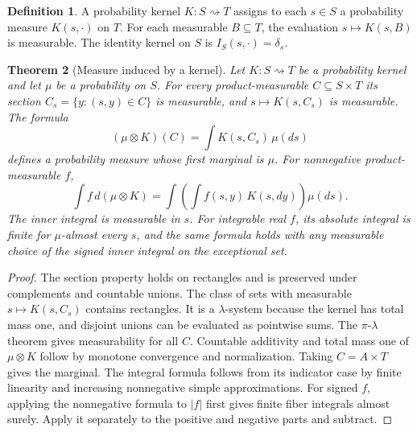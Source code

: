 \documentclass[11pt,oneside,openany]{book}
\theoremstyle{plain}
\newtheorem{theorem}{Theorem}[chapter]
\theoremstyle{definition}
\newtheorem{definition}[theorem]{Definition}
\theoremstyle{remark}
\begin{document}
\begin{definition}
A probability kernel \(K:S\rightsquigarrow T\) assigns to each \(s\in S\) a probability measure \(K(s,\cdot)\) on \(T\). For each measurable \(B\subseteq T\), the evaluation \(s\mapsto K(s,B)\) is measurable. The identity kernel on \(S\) is \(I_S(s,\cdot)=\delta_s\).
\end{definition}

\begin{theorem}[Measure induced by a kernel]\label{thm:kernel-measure}
Let \(K:S\rightsquigarrow T\) be a probability kernel and let \(\mu\) be a probability on \(S\). For every product-measurable \(C\subseteq S\times T\) its section \(C_s=\{y:(s,y)\in C\}\) is measurable, and \(s\mapsto K(s,C_s)\) is measurable. The formula
\[
 (\mu\otimes K)(C)=\int K(s,C_s)\,\mu(ds)
\]
defines a probability measure whose first marginal is \(\mu\). For nonnegative product-measurable \(f\),
\begin{equation}\label{eq:kernel-integration}
 \int f\,d(\mu\otimes K)
   =\int \left(\int f(s,y)\,K(s,dy)\right)\mu(ds).
\end{equation}
The inner integral is measurable in \(s\). For integrable real \(f\), its absolute integral is finite for \(\mu\)-almost every \(s\), and the same formula holds with any measurable choice of the signed inner integral on the exceptional set.
\end{theorem}
\begin{proof}
The section property holds on rectangles and is preserved under complements and countable unions. The class of sets with measurable \(s\mapsto K(s,C_s)\) contains rectangles. It is a \(\lambda\)-system because the kernel has total mass one, and disjoint unions can be evaluated as pointwise sums. The \(\pi\)-\(\lambda\) theorem gives measurability for all \(C\). Countable additivity and total mass one of \(\mu\otimes K\) follow by monotone convergence and normalization. Taking \(C=A\times T\) gives the marginal. The integral formula follows from its indicator case by finite linearity and increasing nonnegative simple approximations. For signed \(f\), applying the nonnegative formula to \(\lvert f\rvert\) first gives finite fiber integrals almost surely. Apply it separately to the positive and negative parts and subtract.
\end{proof}
\end{document}
